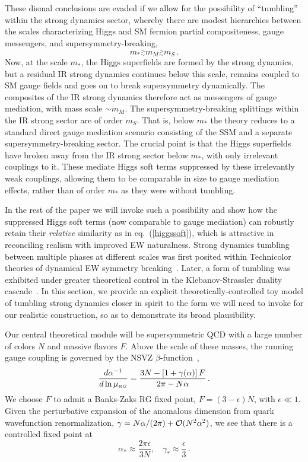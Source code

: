 \documentclass[a4paper,12pt]{article}
\newcommand{\gsim}{\stackrel{>}{_\sim}}
\def\eq#1{eq.~(\ref{#1})}
\def\eq#1{eq.~(\ref{#1})}
\def\mst{m_*}
\def\mS{m_S}
\def\muRG{\mu_{\scriptscriptstyle{\textrm RG}}}
\begin{document}
These dismal conclusions are evaded if we allow for the possibility of ``tumbling'' within the strong dynamics sector, whereby there are modest hierarchies between the scales characterizing Higgs and SM fermion partial compositeness, gauge messengers, and supersymmetry-breaking,
\begin{equation}
   \mst \gsim m_M \gsim \mS\, .
\end{equation}
Now, at the scale $\mst$, the Higgs superfields are formed  by the strong dynamics, but a residual IR strong dynamics continues below this scale, remains coupled to SM gauge fields and goes on to break supersymmetry dynamically.
The composites of the IR strong dynamics therefore act as messengers of gauge mediation, with mass scale $\sim m_M$. The supersymmetry-breaking splittings within the IR strong sector are of order $\mS$. That is, below $\mst$ the theory reduces to a standard direct gauge mediation scenario consisting of the SSM and a separate supersymmetry-breaking sector.
The crucial point is that the Higgs superfields have broken away from the IR strong sector below $\mst$, with only irrelevant couplings to it. These mediate Higgs soft terms
suppressed by these irrelevantly weak couplings, allowing them to be comparable in size to gauge mediation effects, rather than of order $\mst$ as they were without tumbling.

In the rest of the paper we will invoke such a possibility and show how the suppressed Higgs soft terms (now comparable to gauge mediation) can robustly retain their {\it relative} similarity as in \eq{higgssoft}, which is attractive  in reconciling realism with improved EW naturalness.
 Strong dynamics tumbling between multiple phases at different scales was first posited within Technicolor theories of dynamical EW symmetry breaking~\cite{Raby:1979my}. Later, a form of tumbling was exhibited under greater theoretical control in the Klebanov-Strassler duality cascade~\cite{Klebanov:2000hb}. In this section, we provide an explicit theoretically-controlled toy model of tumbling strong dynamics closer in spirit to the form we will need to invoke for our realistic construction, so as to demonstrate its broad plausibility.

 Our central theoretical module will be supersymmetric QCD with a large number of colors $N$ and massive flavors $F$. Above the scale of these masses, the running gauge coupling is governed by the NSVZ $\beta$-function~\cite{Novikov:1983uc},
\begin{equation}
\frac{d \alpha^{-1}}{d \ln \muRG} = \frac{3N - \left[1 +  \gamma(\alpha)\right] F}{2 \pi - N \alpha}\, .
\end{equation}  
We choose  $F$ to admit a Banks-Zaks \cite{Belavin:1974gu,Banks:1981nn} 
RG fixed point, $F = (3 - \epsilon)N$, with $\epsilon \ll 1$.
Given the perturbative expansion of the anomalous dimension from quark wavefunction renormalization,
$\gamma = N \alpha/(2 \pi) + {\cal O}(N^2 \alpha^2)$, we see that there is a controlled fixed point at
\begin{equation}
   \alpha_* \approx \frac{2 \pi \epsilon}{3 N}, ~~~~ \gamma_* \approx \frac{\epsilon}{3}\, .
\end{equation}
\end{document}
